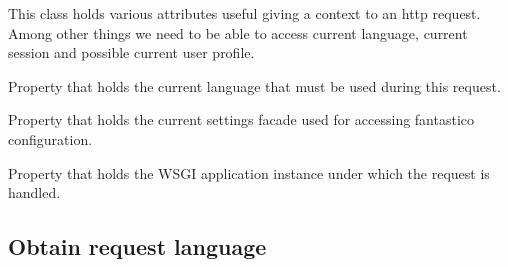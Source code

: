 \documentclass[letterpaper,10pt,english]{sphinxmanual}
\begin{document}
\begin{fulllineitems}
\label{features/request_response:fantastico.middleware.request_context.RequestContext}
This class holds various attributes useful giving a context to an http request. Among other things we need
to be able to access current language, current session and possible current user profile.

\begin{fulllineitems}
\label{features/request_response:fantastico.middleware.request_context.RequestContext.language}
Property that holds the current language that must be used during this request.

\end{fulllineitems}


\begin{fulllineitems}
\label{features/request_response:fantastico.middleware.request_context.RequestContext.settings}
Property that holds the current settings facade used for accessing fantastico configuration.

\end{fulllineitems}


\begin{fulllineitems}
\label{features/request_response:fantastico.middleware.request_context.RequestContext.wsgi_app}
Property that holds the WSGI application instance under which the request is handled.

\end{fulllineitems}


\end{fulllineitems}



\subsection{Obtain request language}
\label{features/request_response:obtain-request-language}
\end{document}
